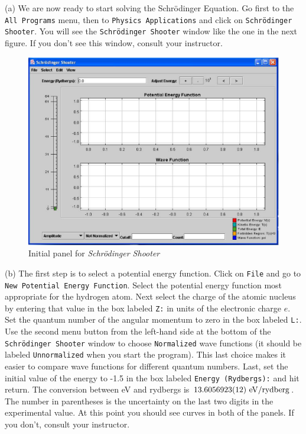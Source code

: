 (a) We are now ready to start solving the Schr\"odinger Equation.
Go first to the {\tt All Programs} menu, then
to {\tt Physics Applications} and click on {\tt Schr\"odinger Shooter}.
You will see the {\tt Schr\"odinger Shooter} window like the one in the next figure.
If you don't see this window, consult your instructor.
\begin{figure}[hbt]
\begin{center}
\includegraphics[width=6.0in]{solveSE/shooter1b.eps}
\caption{Initial panel for {\it Schr\"odinger Shooter}}
\end{center}
\end{figure}

(b) The first step is to select a potential energy function.
Click on {\tt File} and go to {\tt New Potential Energy Function}.
Select the potential energy function most appropriate for the hydrogen atom.
Next select the charge of the atomic nucleus by entering that value in the 
box labeled {\tt Z:} in units of the electronic charge $e$.
Set the quantum number of the angular momentum to zero in the box
labeled {\tt L:}.
Use the second menu button from the left-hand side 
at the bottom of the {\tt Schr\"odinger Shooter}
window to choose {\tt Normalized} wave functions (it should be labeled {\tt Unnormalized}
when you start the program).
This last choice makes it easier to compare wave functions for different quantum numbers.
Last, set the initial value of the energy to -1.5 in the box labeled 
{\tt Energy (Rydbergs):} and hit return.
The conversion between eV and rydbergs is $\rm 13.605 6923(12)~ eV/rydberg$.
The number in parentheses is the uncertainty on the last two digits in the
experimental value.
At this point you should see curves in both of the panels.
If you don't, consult your instructor.

